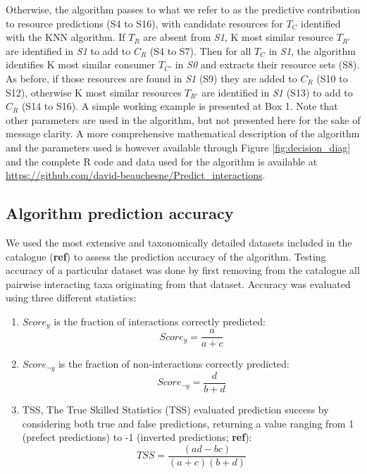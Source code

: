 \documentclass[letterpaper]{article}
\begin{document}
Otherwise, the algorithm passes to what we refer to as the predictive contribution to resource predictions (S4 to S16), with candidate resources for $T_C$ identified with the KNN algorithm. If $T_R$ are absent from \textit{S1}, K most similar resource $T_{R'}$ are identified in \textit{S1} to add to $C_R$ (S4 to S7). Then for all $T_C$ in \textit{S1}, the algorithm identifies K most similar consumer $T_{C'}$ in \textit{S0} and extracts their resource sets (S8). As before, if those resources are found in \textit{S1} (S9) they are added to $C_R$ (S10 to S12), otherwise K most similar resources $T_{R'}$ are identified in \textit{S1} (S13) to add to $C_R$ (S14 to S16). A simple working example is presented at Box 1. Note that other parameters are used in the algorithm, but not presented here for the sake of message clarity. A more comprehensive mathematical description of the algorithm and the parameters used is however available through Figure \ref{fig:decision_diag} and the complete R code and data used for the algorithm is available at \href{https://github.com/david-beauchesne/Predict_interactions}{https://github.com/david-beauchesne/Predict\_interactions}.


\subsection{Algorithm prediction accuracy}
We used the most extensive and taxonomically detailed datasets included in the catalogue (\textbf{ref}) to assess the prediction accuracy of the algorithm. Testing accuracy of a particular dataset was done by first removing from the catalogue all pairwise interacting taxa originating from that dataset. Accuracy was evaluated using three different statistics:

\begin{enumerate}
 \item $Score_y$ is the fraction of interactions correctly predicted:
     \begin{equation}
         Score_y = \frac{a}{a + c}
     \end{equation}

 \item $Score_{\neg y}$ is the fraction of non-interactions correctly predicted:
     \begin{equation}
       Score_{\neg y}  = \frac{d}{b + d}
     \end{equation}

 \item TSS, The True Skilled Statistics (TSS) evaluated prediction success by considering both true and false predictions, returning a value ranging from 1 (prefect predictions) to -1 (inverted predictions; \textbf{ref}): %
     \begin{equation}
       TSS = \frac{(ad - bc)}{(a + c)(b + d)}
     \end{equation}
\end{enumerate}
\end{document}
